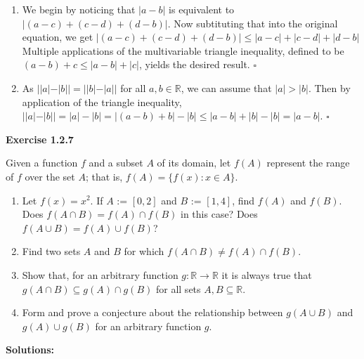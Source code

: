\documentclass[12 pt]{article}
\newcommand{\qed}[0]{$\square$}
\begin{document}
\begin{enumerate}
\item We begin by noticing that \(|a-b|\) is equivalent to \(|(a-c) + (c-d) + (d-b)|\). Now subtituting that into the original equation, we get \(|(a-c) + (c-d) + (d-b)| \leq |a-c| + |c-d| + |d-b|\) Multiple applications of the multivariable triangle inequality, defined to be \((a-b) + c \leq |a-b| + |c|\), yields the desired result. \qed

\item As \(||a|-|b|| = ||b| - |a||\) for all \(a, b \in \mathbb{R}\), we can assume that \(|a| > |b|\). Then by application of the triangle inequality, \(||a|-|b|| = |a| - |b| = |(a-b) + b| - |b| \leq |a-b| + |b| - |b| = |a-b|\). \qed
\end{enumerate}

\newpage

\textbf{Exercise 1.2.7}

Given a function \(f\) and a subset \(A\) of its domain, let \(f(A)\) represent the range of \(f\) over the set \(A\); that is, \(f(A) = \{f(x) \colon x \in A\}\).

\begin{enumerate}
    \item Let \(f(x) = x^{2}\). If \(A\) := \([0, 2]\) and \(B\) := \([1, 4]\), find \(f(A)\) and \(f(B)\). Does \(f(A \cap B) = f(A) \cap f(B)\) in this case? Does \(f(A \cup B) = f(A) \cup f(B)\)?
    \item Find two sets \(A\) and \(B\) for which \(f(A \cap B) \neq f(A) \cap f(B)\).
    \item Show that, for an arbitrary function \(g \colon \mathbb{R} \to \mathbb{R}\) it is always true that \(g(A \cap B) \subseteq g(A) \cap g(B)\) for all sets \(A, B \subseteq \mathbb{R}\).
    \item Form and prove a conjecture about the relationship between \(g(A \cup B)\) and \(g(A) \cup g(B)\) for an arbitrary function \(g\).
\end{enumerate}

\vspace{5mm}

\textbf{Solutions:}
\end{document}
